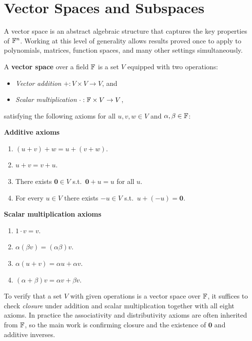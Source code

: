 \section{Vector Spaces and Subspaces}

A vector space is an abstract algebraic structure that captures the key
properties of $\mathbb{F}^n$.  Working at this level of generality allows results
proved once to apply to polynomials, matrices, function spaces, and many other
settings simultaneously.

\begin{defbox}
A \textbf{vector space} over a field $\mathbb{F}$ is a set $V$ equipped with two
operations:
\begin{itemize}
    \item \emph{Vector addition} $+: V\times V\to V$, and
    \item \emph{Scalar multiplication} $\cdot:\mathbb{F}\times V\to V$,
\end{itemize}
satisfying the following axioms for all $u,v,w\in V$ and $\alpha,\beta\in\mathbb{F}$:

\medskip
\textbf{Additive axioms}
\begin{enumerate}[label=A\textsubscript{\arabic*}.]
    \item $(u+v)+w = u+(v+w)$.
    \item $u+v = v+u$.
    \item There exists $\mathbf{0}\in V$ s.t.\ $\mathbf{0}+u=u$ for all $u$.
    \item For every $u\in V$ there exists $-u\in V$ s.t.\ $u+(-u)=\mathbf{0}$.
\end{enumerate}

\medskip
\textbf{Scalar multiplication axioms}
\begin{enumerate}[label=P\textsubscript{\arabic*}.]
    \item $1\cdot v = v$.
    \item $\alpha(\beta v) = (\alpha\beta)v$.
    \item $\alpha(u+v) = \alpha u + \alpha v$.
    \item $(\alpha+\beta)v = \alpha v + \beta v$.
\end{enumerate}
\end{defbox}

\begin{tipbox}
To verify that a set $V$ with given operations is a vector space over $\mathbb{F}$, it
suffices to check \emph{closure} under addition and scalar multiplication
together with all eight axioms.  In practice the associativity and distributivity
axioms are often inherited from $\mathbb{F}$, so the main work is confirming closure and
the existence of $\mathbf{0}$ and additive inverses.
\end{tipbox}

